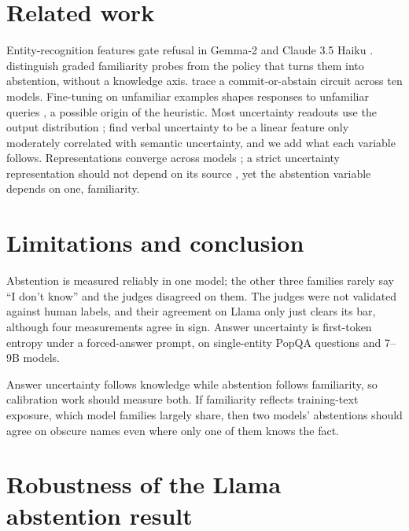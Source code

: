 \documentclass{article}
\newcommand{\idk}{``I don't know''}
\begin{document}
\section{Related work}

Entity-recognition features gate refusal in Gemma-2 and Claude 3.5 Haiku \citep{ferrando2025iknow,lindsey2025biology}. \citet{brzezinka2026familiarity} distinguish graded familiarity probes from the policy that turns them into abstention, without a knowledge axis. \citet{nguyen2026commit} trace a commit-or-abstain circuit across ten models. Fine-tuning on unfamiliar examples shapes responses to unfamiliar queries \citep{kang2025unfamiliar}, a possible origin of the heuristic. Most uncertainty readouts use the output distribution \citep{kadavath2022know,kuhn2023semantic,stolfo2024confidence,gurnee2024universal}; \citet{ji2025hedging} find verbal uncertainty to be a linear feature only moderately correlated with semantic uncertainty, and we add what each variable follows. Representations converge across models \citep{huh2024platonic}; a strict uncertainty representation should not depend on its source \citep{lippl2024source}, yet the abstention variable depends on one, familiarity.

\section{Limitations and conclusion}

Abstention is measured reliably in one model; the other three families rarely say \idk{} and the judges disagreed on them. The judges were not validated against human labels, and their agreement on Llama only just clears its bar, although four measurements agree in sign. Answer uncertainty is first-token entropy under a forced-answer prompt, on single-entity PopQA questions and 7--9B models.

Answer uncertainty follows knowledge while abstention follows familiarity, so calibration work should measure both. If familiarity reflects training-text exposure, which model families largely share, then two models' abstentions should agree on obscure names even where only one of them knows the fact.




\appendix

\section{Robustness of the Llama abstention result}
\label{app:robust}
\end{document}
